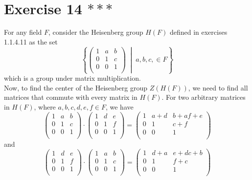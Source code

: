 \documentclass{article}
\begin{document}
    \section*{Exercise 14 $***$}
    For any field $F$, consider the Heisenberg group $H(F)$
    defined in exercises 1.1.4.11
    as the set
    \[\left\{ \begin{pmatrix}
        1 & a & b \\        
        0 & 1 & c \\
        0 & 0 & 1 \\
    \end{pmatrix} \; \middle\vert \; a, b, c, \in F \right\}\]
    which is a group under matrix multiplication. \\
    Now, to find the center of the Heisenberg group $Z(H(F))$,
    we need to find all matrices that commute with every matrix in $H(F)$.
    For two arbitrary matrices in $H(F)$,
    where $a, b, c, d, e, f \in F$, we have
    \[\begin{pmatrix}
        1 & a & b \\        
        0 & 1 & c \\
        0 & 0 & 1 \\
    \end{pmatrix} \cdot \begin{pmatrix}
        1 & d & e \\        
        0 & 1 & f \\
        0 & 0 & 1 \\
    \end{pmatrix}
    = \begin{pmatrix}
        1 & a + d & b + af + e \\        
        0 & 1 & c + f \\
        0 & 0 & 1 \\
    \end{pmatrix}
    \]
    and
    \[\begin{pmatrix}
        1 & d & e \\        
        0 & 1 & f \\
        0 & 0 & 1 \\
    \end{pmatrix} \cdot \begin{pmatrix}
        1 & a & b \\        
        0 & 1 & c \\
        0 & 0 & 1 \\
    \end{pmatrix}
    = \begin{pmatrix}
        1 & d + a & e + dc + b \\        
        0 & 1 & f + c \\
        0 & 0 & 1 \\
    \end{pmatrix}
    \]
\end{document}
